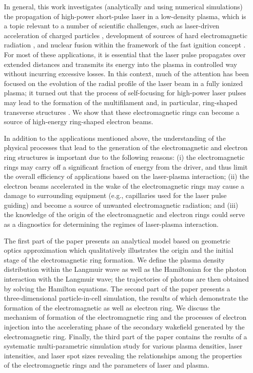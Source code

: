 \documentclass[10pt, twoside, a4paper, openright]{report}
\begin{document}
In general, this work investigates (analytically and using numerical simulations) the propagation of high-power short-pulse laser in a low-density plasma, which is a topic relevant to a number of scientific challenges, such as laser-driven acceleration of charged particles \cite{Tajima1979, Esarey2009, Gonsalves2019}, development of sources of hard electromagnetic radiation \cite{Pirozhkov2012, Bulanov2013}, and nuclear fusion within the framework of the fast ignition concept \cite{Tabak1994}. For most of these applications, it is essential that the laser pulse propagates over extended distances and transmits its energy into the plasma in controlled way without incurring excessive losses. In this context, much of the attention has been focused on the evolution of the radial profile of the laser beam in a fully ionized plasma; it turned out that the process of self-focusing for high-power laser pulses may lead to the formation of the multifilament and, in particular, ring-shaped transverse structures \cite{Mori1988, Cohen1991, Borisov1992, Krushelnick1997, Cattani2001, Kim2002, Naseri2016, Kovalev2019}. We show that these electromagnetic rings can become a source of high-energy ring-shaped electron beams. 

In addition to the applications mentioned above, the understanding of the physical processes that lead to the generation of the electromagnetic and electron ring structures is important due to the following reasons: (i) the electromagnetic rings may carry off a significant fraction of energy from the driver, and thus limit the overall efficiency of applications based on the laser-plasma interaction; (ii) the electron beams accelerated in the wake of the electromagnetic rings may cause a damage to surrounding equipment (e.g., capillaries used for the laser pulse guiding) and become a source of unwanted electromagnetic radiation; and (iii) the knowledge of the origin of the electromagnetic and electron rings could serve as a diagnostics for determining the regimes of laser-plasma interaction.

The first part of the paper presents an analytical model based on geometric optics approximation which qualitatively illustrates the origin and the initial stage of the electromagnetic ring formation. We define the plasma density distribution within the Langmuir wave as well as the Hamiltonian for the photon interaction with the Langmuir wave; the trajectories of photons are then obtained by solving the Hamilton equations. The second part of the paper presents a three-dimensional particle-in-cell simulation, the results of which demonstrate the formation of the electromagnetic as well as electron ring. We discuss the mechanism of formation of the electromagnetic ring and the processes of electron injection into the accelerating phase of the secondary wakefield generated by the electromagnetic ring. Finally, the third part of the paper contains the results of a systematic multi-parametric simulation study for various plasma densities, laser intensities, and laser spot sizes revealing the relationships among the properties of the electromagnetic rings and the parameters of laser and plasma.
\end{document}

